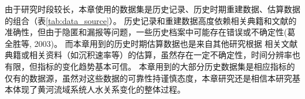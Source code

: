 由于研究时段较长，本章使用的数据集是历史记录、历史时期重建数据、估算数据的组合（表\ref{tab:data_source}）。
历史记录和重建数据高度依赖相关典籍和文献的准确性，但由于隐匿和漏报等问题，一些历史档案中可能存在错误或不确定性(葛全胜等, 2003)。
而本章用到的历史时期估算数据也是来自其他研究根据 相关文献典籍或相关资料（如沉积速率等）的估算，虽然存在一定不确定性，时间分辨率也有限，但指标的变化趋势基本可信。
本章用到的大部分历史数据集是相应指标的仅有的数据源，虽然对这些数据的可靠性持谨慎态度，本章研究还是相信本研究基本体现了黄河流域系统人水关系变化的整体过程。

